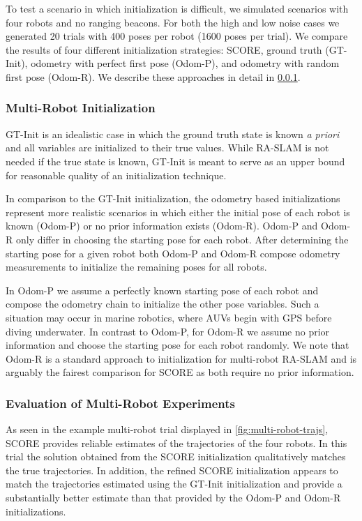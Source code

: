 To test a scenario in which initialization is difficult, we
simulated scenarios with four robots and no ranging beacons. For both the high
and low noise cases we generated 20 trials with 400 poses per robot (1600 poses
per trial). We compare the results of four different initialization strategies:
SCORE, ground truth (GT-Init), odometry with perfect first pose (Odom-P), and
odometry with random first pose (Odom-R). We describe these approaches in detail
in \cref{sec:multi-robot-init}.

\subsubsection{Multi-Robot Initialization}
\label{sec:multi-robot-init}

GT-Init is an idealistic case in which the ground truth state is known \textit{a
priori} and all variables are initialized to their true values. While RA-SLAM is
not needed if the true state is known, GT-Init is meant to serve as an upper
bound for reasonable quality of an initialization technique.

In comparison to the GT-Init initialization, the odometry based initializations
represent more realistic scenarios in which either the initial pose of each
robot is known (Odom-P) or no prior information exists (Odom-R). Odom-P and
Odom-R only differ in choosing the starting pose for each robot. After
determining the starting pose for a given robot both Odom-P and Odom-R compose
odometry measurements to initialize the remaining poses for all robots.

In Odom-P we assume a perfectly known starting pose of each robot and compose
the odometry chain to initialize the other pose variables. Such a situation may
occur in marine robotics, where AUVs begin with GPS before diving underwater.
In contrast to Odom-P, for Odom-R we assume no prior information and choose the
starting pose for each robot randomly. We note that Odom-R is a standard
approach to initialization for multi-robot RA-SLAM \cite{guo2017ijmav,li20arxiv}
and is arguably the fairest comparison for SCORE as both require no prior
information.


\subsubsection{Evaluation of Multi-Robot Experiments}

As seen in the example multi-robot trial displayed in
\cref{fig:multi-robot-trajs}, SCORE provides reliable estimates of the
trajectories of the four robots. In this trial the solution obtained from the
SCORE initialization qualitatively matches the true trajectories. In addition,
the refined SCORE initialization appears to match the trajectories estimated
using the GT-Init initialization and provide a substantially better estimate
than that provided by the Odom-P and Odom-R initializations.

